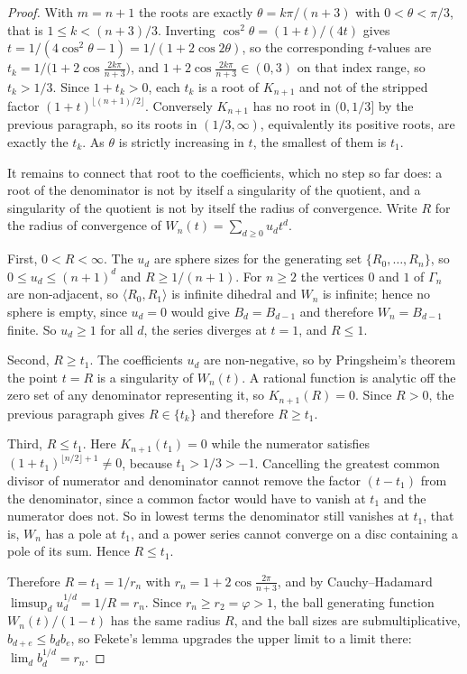 \documentclass[11pt,a4paper]{article}
\theoremstyle{definition}
\theoremstyle{remark}
\theoremstyle{plain}
\begin{document}
\begin{proof}
With $m=n+1$ the roots are exactly $\theta=k\pi/(n+3)$ with $0<\theta<\pi/3$, that is
$1\le k<(n+3)/3$. Inverting $\cos^2\theta=(1+t)/(4t)$ gives $t=1/(4\cos^2\theta-1)
=1/(1+2\cos2\theta)$, so the corresponding $t$-values are
$t_k=1/\bigl(1+2\cos\frac{2k\pi}{n+3}\bigr)$, and $1+2\cos\frac{2k\pi}{n+3}\in(0,3)$ on that
index range, so $t_k>1/3$. Since $1+t_k>0$, each $t_k$ is a root of $K_{n+1}$ and not of the
stripped factor $(1+t)^{\lfloor(n+1)/2\rfloor}$. Conversely $K_{n+1}$ has no root in $(0,1/3]$
by the previous paragraph, so its roots in $(1/3,\infty)$, equivalently its positive roots, are
exactly the $t_k$. As $\theta$ is strictly increasing in $t$, the smallest of them is $t_1$.

It remains to connect that root to the coefficients, which no step so far does: a root of the
denominator is not by itself a singularity of the quotient, and a singularity of the quotient
is not by itself the radius of convergence. Write $R$ for the radius of convergence of
$W_n(t)=\sum_{d\ge0}u_dt^d$.

First, $0<R<\infty$. The $u_d$ are sphere sizes for the generating set $\{R_0,\dots,R_n\}$, so
$0\le u_d\le(n+1)^d$ and $R\ge1/(n+1)$. For $n\ge2$ the vertices $0$ and $1$ of $\Gamma_n$ are
non-adjacent, so $\langle R_0,R_1\rangle$ is infinite dihedral and $W_n$ is infinite; hence no
sphere is empty, since $u_d=0$ would give $B_d=B_{d-1}$ and therefore $W_n=B_{d-1}$ finite.
So $u_d\ge1$ for all $d$, the series diverges at $t=1$, and $R\le1$.

Second, $R\ge t_1$. The coefficients $u_d$ are non-negative, so by Pringsheim's theorem the
point $t=R$ is a singularity of $W_n(t)$. A rational function is analytic off the zero set of
any denominator representing it, so $K_{n+1}(R)=0$. Since $R>0$, the previous paragraph gives
$R\in\{t_k\}$ and therefore $R\ge t_1$.

Third, $R\le t_1$. Here $K_{n+1}(t_1)=0$ while the numerator satisfies
$(1+t_1)^{\lfloor n/2\rfloor+1}\ne0$, because $t_1>1/3>-1$. Cancelling the greatest common
divisor of numerator and denominator cannot remove the factor $(t-t_1)$ from the denominator,
since a common factor would have to vanish at $t_1$ and the numerator does not. So in lowest
terms the denominator still vanishes at $t_1$, that is, $W_n$ has a pole at $t_1$, and a power
series cannot converge on a disc containing a pole of its sum. Hence $R\le t_1$.

Therefore $R=t_1=1/r_n$ with $r_n=1+2\cos\frac{2\pi}{n+3}$, and by Cauchy--Hadamard
$\limsup_du_d^{1/d}=1/R=r_n$. Since $r_n\ge r_2=\varphi>1$, the ball generating function
$W_n(t)/(1-t)$ has the same radius $R$, and the ball sizes are submultiplicative,
$b_{d+e}\le b_db_e$, so Fekete's lemma upgrades the upper limit to a limit there:
$\lim_db_d^{1/d}=r_n$.
\end{proof}
\end{document}
